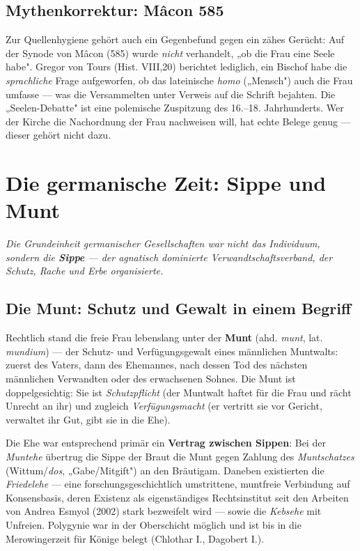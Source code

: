 \documentclass[11pt,a4paper,ngerman]{scrartcl}
\newcommand{\chipbase}[2]{\hspace{0pt}{\footnotesize\textcolor{#1}{[\textsc{#2}]}}}
\newcommand{\chipbelegt}[1]{\chipbase{chipgreen}{#1}}
\newcommand{\chipumstritten}[1]{\chipbase{chipred}{#1}}
\begin{document}
\subsection*{Mythenkorrektur: Mâcon 585}

Zur Quellenhygiene gehört auch ein Gegenbefund gegen ein zähes Gerücht: Auf der Synode von Mâcon (585) wurde \emph{nicht} verhandelt, „ob die Frau eine Seele habe". Gregor von Tours (Hist. VIII,20) berichtet lediglich, ein Bischof habe die \emph{sprachliche} Frage aufgeworfen, ob das lateinische \emph{homo} („Mensch") auch die Frau umfasse — was die Versammelten unter Verweis auf die Schrift bejahten. Die „Seelen-Debatte" ist eine polemische Zuspitzung des 16.–18. Jahrhunderts. Wer der Kirche die Nachordnung der Frau nachweisen will, hat echte Belege genug — dieser gehört nicht dazu. \chipbelegt{belegt}


\section{Die germanische Zeit: Sippe und Munt}

\noindent\textit{Die Grundeinheit germanischer Gesellschaften war nicht das Individuum, sondern die \textbf{Sippe} — der agnatisch dominierte Verwandtschaftsverband, der Schutz, Rache und Erbe organisierte.}
\medskip

\subsection*{Die Munt: Schutz und Gewalt in einem Begriff}

Rechtlich stand die freie Frau lebenslang unter der \textbf{Munt} (ahd. \emph{munt}, lat. \emph{mundium}) — der Schutz- und Verfügungsgewalt eines männlichen Muntwalts: zuerst des Vaters, dann des Ehemannes, nach dessen Tod des nächsten männlichen Verwandten oder des erwachsenen Sohnes. Die Munt ist doppelgesichtig: Sie ist \emph{Schutzpflicht} (der Muntwalt haftet für die Frau und rächt Unrecht an ihr) und zugleich \emph{Verfügungsmacht} (er vertritt sie vor Gericht, verwaltet ihr Gut, gibt sie in die Ehe). \chipbelegt{belegt}

Die Ehe war entsprechend primär ein \textbf{Vertrag zwischen Sippen}: Bei der \emph{Muntehe} übertrug die Sippe der Braut die Munt gegen Zahlung des \emph{Muntschatzes} (Wittum/\emph{dos}, „Gabe/Mitgift") an den Bräutigam. Daneben existierten die \emph{Friedelehe} — eine forschungsgeschichtlich umstrittene, muntfreie Verbindung auf Konsensbasis, deren Existenz als eigenständiges Rechtsinstitut seit den Arbeiten von Andrea Esmyol (2002) stark bezweifelt wird \chipumstritten{umstritten} — sowie die \emph{Kebsehe} mit Unfreien. Polygynie war in der Oberschicht möglich und ist bis in die Merowingerzeit für Könige belegt (Chlothar I., Dagobert I.). \chipbelegt{belegt}
\end{document}
